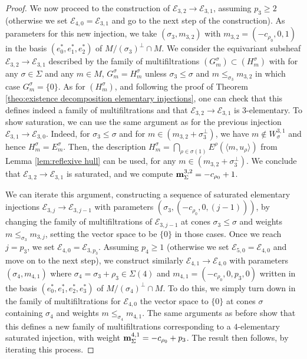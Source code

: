 \documentclass[a4paper,10pt]{amsart}
\theoremstyle{plain}{
    \newtheorem{theorem}{Theorem}[section]
    \newtheorem{lemma}[theorem]{Lemma}
    \newtheorem{corollary}[theorem]{Corollary}
    \newtheorem{proposition}[theorem]{Proposition}
    \newtheorem{conjecture}[theorem]{Conjecture}
}
\theoremstyle{definition}{
    \newtheorem{definition}[theorem]{Definition}
    \newtheorem{defn-thm}[theorem]{Definition-Theorem}
    \newtheorem{example}[theorem]{Example}
    \newtheorem{notation}[theorem]{Notation}
}
\theoremstyle{remark}{
    \newtheorem{remark}[theorem]{Remark}
    \newtheorem{problem}[theorem]{Problem}
    \newtheorem{question}[theorem]{Question}
}
\def\um{{\bf m}}
\def\cE{\mathcal{E}}
\begin{document}
\begin{proof}
 We now proceed to the construction of $\cE_{3,2}\to\cE_{3,1}$, assuming $p_3\geq 2$ (otherwise we set $\cE_{4,0}=\cE_{3,1}$ and go to the next step of the construction). As parameters for this new injection, we take $(\sigma_3,m_{3,2})$ with 
 $m_{3,2}=(-c_{\rho_0},0,1)$ in the basis $(e_0^*,e_1^*,e_2^*)$ of $M/(\sigma_3)^\perp\cap M$. We consider the equivariant subsheaf $\cE_{3,2}\to \cE_{3,1}$ described by the family of multifiltrations $(G^\sigma_m)\subset (H^\sigma_m)$ with for any $\sigma\in\Sigma$ and any $m\in M$, $G^\sigma_m=H^\sigma_m$ unless $\sigma_3\leq\sigma$ and $m\leq_{\sigma_3} m_{3,2}$ in which case $G^\sigma_m=\lbrace 0 \rbrace$. As for $(H^\sigma_m)$, and following the proof of Theorem \ref{theo:existence decomposition elementary injections}, one can check that this defines indeed a family of multifiltrations and that $\cE_{3,2}\to \cE_{3,1}$ is $3$-elementary. To show saturation, we can use the same argument as for the previous injection $\cE_{3,1}\to \cE_{3,0}$. Indeed, for $\sigma_3\leq\sigma$ and for $m\in (m_{3,2}+\sigma_3^\perp)$, we have $m\notin W_\sigma^{3,1}$ and hence $H^\sigma_m  = E^\sigma_m$. Then, the description $H^\sigma_m=\displaystyle\bigcap_{\rho\in\sigma(1)} E^\rho (\langle m, u_\rho \rangle)$ from Lemma \ref{lem:reflexive hull} can be used, for any $m\in (m_{3,2}+\sigma_3^\perp)$. We conclude that $\cE_{3,2}\to \cE_{3,1}$ is saturated, and we compute $\um_\Sigma^{3,2}=-c_{\rho_0}+1$.
 
 We can iterate this argument, constructing a sequence of saturated elementary injections $\cE_{3,j}\to \cE_{3,j-1}$ with parameters $(\sigma_3,(-c_{\rho_0},0,(j-1)))$, by changing the family of multifiltrations of $\cE_{3,j-1}$ at cones $\sigma_3\leq\sigma$ and weights $m\leq_{\sigma_3} m_{3,j}$, setting the vector space to be $\lbrace 0 \rbrace$ in those cases. Once we reach $j=p_3$, we set $\cE_{4,0}=\cE_{3,p_3}$. Assuming $p_4\geq 1$ (otherwise we set $\cE_{5,0}=\cE_{4,0}$ and move on to the next step), we construct similarly $\cE_{4,1}\to\cE_{4,0}$ with parameters $(\sigma_4,m_{4,1})$ where $\sigma_4=\sigma_3+\rho_3\in\Sigma(4)$ and $m_{4,1}=(-c_{\rho_0},0,p_3,0)$ written in the basis $(e_0^*,e_1^*,e_2^*,e_3^*)$ of $M/(\sigma_4)^\perp\cap M$. To do this, we simply turn down in the family of multifiltrations for $\cE_{4,0}$ the vector space to $\lbrace 0 \rbrace$ at cones $\sigma$ containing $\sigma_4$ and weights $m\leq_{\sigma_4} m_{4,1}$. The same arguments as before show that this defines a new family of multifiltrations corresponding to a $4$-elementary saturated injection, with weight 
 $\um_\Sigma^{4,1}=-c_{\rho_0}+p_3$. The result then follows, by iterating this process.
\end{proof}
\end{document}
